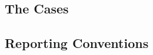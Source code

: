 \subsection{The Cases}
\label{ssec:case_definitions}

\subsection{Reporting Conventions}
\label{ssec:reporting_template}

